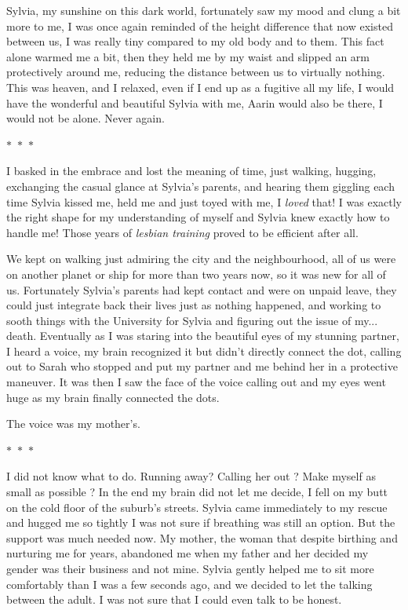 \documentclass[colorlinks,12pt,a4paper]{book}
\newcommand\sep{\begin{center}
  \boldmath $\ast$~$\ast$~$\ast$
\end{center}}
\begin{document}
 Sylvia, my sunshine on this dark world, fortunately saw my mood and clung a bit more to me, I was once again reminded of 
 the height difference that now existed between us, I was really tiny compared to my old body and to them. This fact alone warmed 
 me a bit, then they held me by my waist and slipped an arm protectively around me, reducing the distance between us to virtually 
 nothing. This was heaven, and I relaxed, even if I end up as a fugitive all my life, I would have the wonderful and beautiful 
 Sylvia with me, Aarin would also be there, I would not be alone. Never again.
 
 \sep
 
 I basked in the embrace and lost the meaning of time, just walking, hugging, exchanging the casual glance at Sylvia's parents,
 and hearing them giggling each time Sylvia kissed me, held me and just toyed with me, I \textit{loved} that! I was exactly the 
 right shape for my understanding of myself and Sylvia knew exactly how to handle me! Those years of \textit{lesbian training} proved 
 to be efficient after all.\par 
 \bigskip
 
 We kept on walking just admiring the city and the neighbourhood, all of us were on another planet or ship for more than two years 
 now, so it was new for all of us. Fortunately Sylvia's parents had kept contact and were on unpaid leave, they could just integrate back 
 their lives just as nothing happened, and working to sooth things with the University for Sylvia and figuring out the issue of my... death.
 Eventually as I was staring into the beautiful eyes of my stunning partner, I heard a voice, my brain recognized it but didn't directly 
 connect the dot, calling out to Sarah who stopped and put my partner and me behind her in a protective maneuver. It was then I saw 
 the face of the voice calling out and my eyes went huge as my brain finally connected the dots.\par
 \bigskip
 
 The voice was my mother's.
 
 \sep
 
 I did not know what to do. Running away? Calling her out ? Make myself as small as possible ? In the end my brain did not let 
 me decide, I fell on my butt on the cold floor of the suburb's streets. Sylvia came immediately to my rescue and hugged me 
 so tightly I was not sure if breathing was still an option. But the support was much needed now. My mother, the woman that despite birthing and nurturing
 me for years, abandoned me when my father and her decided my gender was their business and not mine. Sylvia gently helped me to sit more 
 comfortably than I was a few seconds ago, and we decided to let the talking between the adult. I was not sure that I could even talk to be honest.\par 
 \bigskip
 
\end{document}
